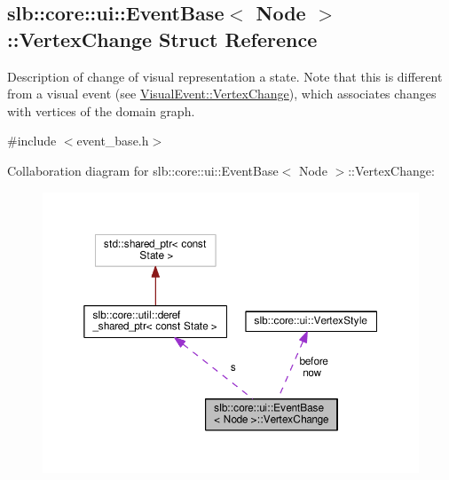 \hypertarget{structslb_1_1core_1_1ui_1_1EventBase_1_1VertexChange}{}\subsection{slb\+:\+:core\+:\+:ui\+:\+:Event\+Base$<$ Node $>$\+:\+:Vertex\+Change Struct Reference}
\label{structslb_1_1core_1_1ui_1_1EventBase_1_1VertexChange}


Description of change of visual representation a state. Note that this is different from a visual event (see \hyperlink{structslb_1_1core_1_1ui_1_1VisualEvent_1_1VertexChange}{Visual\+Event\+::\+Vertex\+Change}), which associates changes with vertices of the domain graph.  




{\ttfamily \#include $<$event\+\_\+base.\+h$>$}



Collaboration diagram for slb\+:\+:core\+:\+:ui\+:\+:Event\+Base$<$ Node $>$\+:\+:Vertex\+Change\+:\nopagebreak
\begin{figure}[H]
\begin{center}
\leavevmode
\includegraphics[width=350pt]{structslb_1_1core_1_1ui_1_1EventBase_1_1VertexChange__coll__graph}
\end{center}
\end{figure}
